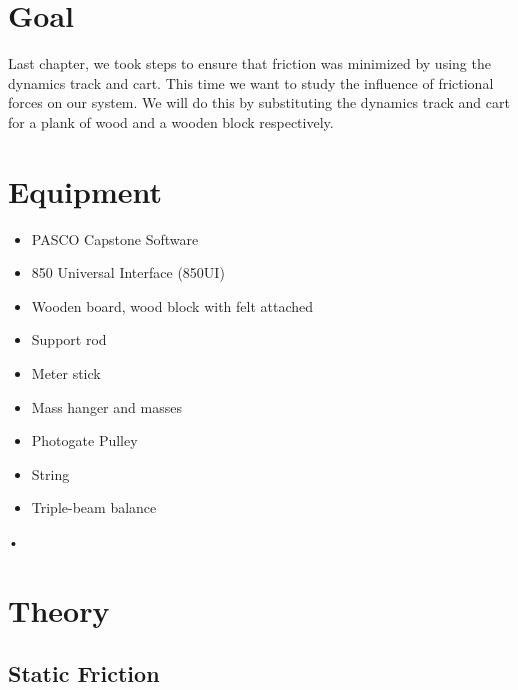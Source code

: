 \documentclass[main.tex]{subfiles}
\begin{document}
\section*{Goal}
Last chapter, we took steps to ensure that friction was minimized by using the dynamics track and cart. This time we want to study the influence of frictional forces on our system. We will do this by substituting the dynamics track and cart for a plank of wood and a wooden block respectively.

\section*{Equipment}
\begin{itemize}
\item
PASCO Capstone Software
\item
850 Universal Interface (850UI)
\item
Wooden board, wood block with felt attached
\item
Support rod
\item
Meter stick
\item
Mass hanger and masses
\item
Photogate Pulley
\item
String
\item
Triple-beam balance
\end{itemize}•

\section*{Theory}


\subsection*{Static Friction}

\begin{figure}
\centering
{}
\caption{}\label{fig:FrictGraph}
\end{figure}
\end{document}
